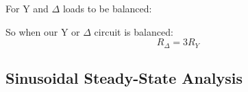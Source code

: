 \begin{multicols}{2}
{        For $\mathrm{Y}$ and $\Delta$ loads to be balanced:

        So when our $\mathrm{Y}$ or $\Delta$ circuit is balanced:
        \begin{equation*}
            R_\Delta = 3 R_Y
        \end{equation*}

    }

\end{multicols}


\newpage
\subsection{Sinusoidal Steady-State Analysis}%
\label{sub:sinusoidal-steady-state-analysis}

